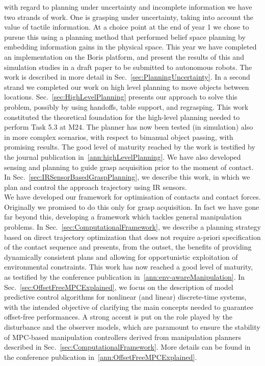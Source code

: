 \documentclass[a4paper,11pt,pdf]{pacmanreport}
\begin{document}
 with regard to planning under uncertainty and incomplete information we have two strands of work. One is grasping under uncertainty, taking into account the value of tactile information. At a choice point at the end of year 1 we chose to pursue this using a planning method that performed belief space planning by embedding information gains in the physical space. This year we have completed an implementation on the Boris platform, and present the results of this and simulation studies in a draft paper to be submitted to autonomous robots. The work is described in more detail in Sec.~\ref{sec:PlanningUncertainty}. In a second strand we completed our work on high level planning to move objects between locations. Sec.~\ref{sec:HighLevelPlanning} presents our approach to solve this problem, possibly by using handoffs, table support, and regrasping. This work constituted the theoretical foundation for the high-level planning needed to perform Task 5.3 at M24. The planner has now been tested (in simulation) also in more complex scenarios, with respect to bimanual object passing, with promising results.
The good level of maturity reached by the work is testified by the journal publication in~\ref{ann:highLevelPlanning}.  We have also developed sensing and planning to guide grasp acquisition prior to the moment of contact. In Sec.~\ref{sec:IRSensorBasedGraspPlanning}, we describe this work, in which we plan and control the approach trajectory using IR sensors. \\

 We have developed our framework for optimisation of contacts and contact forces. Originally we promised to do this only for grasp acquisition. In fact we have gone far beyond this, developing a framework which tackles general manipulation problems. In Sec.~\ref{sec:ComputationalFramework}, we describe a planning strategy based on direct trajectory optimization that does not require a-priori specification of the contact sequence and presents, from the outset, the benefits of providing dynamically consistent plans and allowing for opportunistic exploitation of environmental constraints. This work has now reached a good level of maturity, as testified by the conference publication in~\ref{ann:env-awareManipulation}. In Sec.~\ref{sec:OffsetFreeMPCExplained}, we focus on the description of model predictive control algorithms for nonlinear (and linear) discrete-time systems, with the intended objective of clarifying the main concepts needed to guarantee offset-free performances. A strong accent is put on the role played by the disturbance and the observer models, which are paramount to ensure the stability of MPC-based manipulation controllers derived from manipulation planners described in Sec.~\ref{sec:ComputationalFramework}. More details can be found in the conference publication in~\ref{ann:OffsetFreeMPCExplained}.
\end{document}
